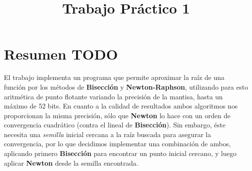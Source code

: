 \documentclass[a4paper]{article}
\title{Trabajo Práctico 1}
\begin{document}
\maketitle
\newpage

\tableofcontents


\newpage
\section{Resumen TODO}
El trabajo implementa un programa que permite aproximar la raíz de una función por los métodos de \textbf{Bisección} y \textbf{Newton-Raphson}, utilizando para esto aritmética de punto flotante variando la precisión de la mantisa, hasta un máximo de 52 bits. En cuanto a la calidad de resultados ambos algoritmos nos proporcionan la misma precisión, sólo que \textbf{Newton} lo hace con un orden de convergencia cuadrático (contra el lineal de \textbf{Bisección}). Sin embargo, éste necesita una \textit{semilla} inicial cercana a la raíz buscada para asegurar la convergencia, por lo que decidimos implementar una combinación de ambos, aplicando primero \textbf{Bisección} para encontrar un punto inicial cercano, y luego aplicar \textbf{Newton} desde la semilla encontrada.  
\end{document}
